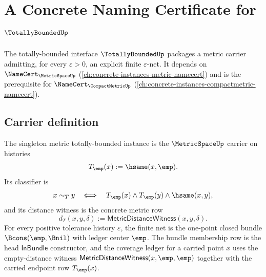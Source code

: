 \chapter{A Concrete Naming Certificate for $\TotallyBoundedUp$}
\label{ch:concrete-instances-totallybounded-namecert}

The totally-bounded interface $\TotallyBoundedUp$ packages a metric carrier admitting, for every $\varepsilon > 0$, an explicit finite $\varepsilon$-net. It depends on $\NameCert_{\MetricSpaceUp}$ (\autoref{ch:concrete-instances-metric-namecert}) and is the prerequisite for $\NameCert_{\CompactMetricUp}$ (\autoref{ch:concrete-instances-compactmetric-namecert}).

\section{Carrier definition}
\label{sec:totallybounded-carrier}

\begin{definition}
\label{def:singleton-metric-totally-bounded-instance}
The singleton metric totally-bounded instance is the $\MetricSpaceUp$ carrier
on histories
$$
T_{\emp}(x):=\hsame(x,\emp).
$$
Its classifier is
$$
x\sim_T y \quad:\!\!\Longleftrightarrow\quad
T_{\emp}(x)\land T_{\emp}(y)\land \hsame(x,y),
$$
and its distance witness is the concrete metric row
$$
d_T(x,y,\delta):=\mathsf{MetricDistanceWitness}(x,y,\delta).
$$
For every positive tolerance history $\varepsilon$, the finite net is the
one-point closed bundle $\Bcons(\emp,\Bnil)$ with ledger center $\emp$. The
bundle membership row is the head $\mathsf{InBundle}$ constructor, and the
coverage ledger for a carried point $x$ uses the empty-distance witness
$\mathsf{MetricDistanceWitness}(x,\emp,\emp)$ together with the carried endpoint
row $T_{\emp}(x)$.
\end{definition}

